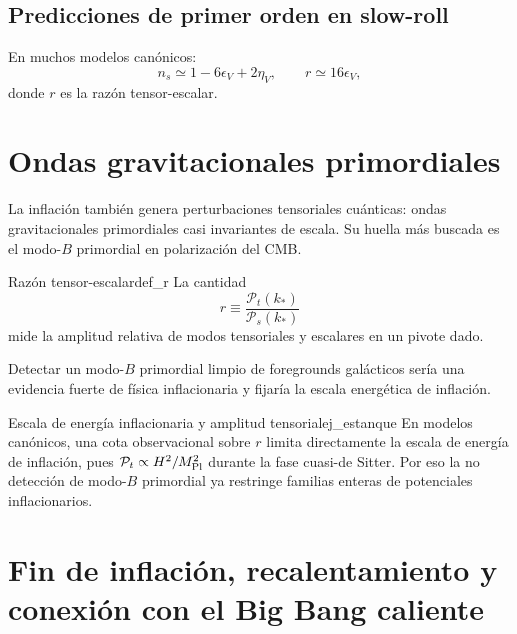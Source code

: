 \subsection{Predicciones de primer orden en slow-roll}

En muchos modelos canónicos:
\begin{equation}
  n_s \simeq 1-6\epsilon_V+2\eta_V,
  \qquad
  r \simeq 16\epsilon_V,
\end{equation}
donde $r$ es la razón tensor-escalar.

\section{Ondas gravitacionales primordiales}
\label{sec:gw_primordiales}

La inflación también genera perturbaciones tensoriales cuánticas: ondas gravitacionales primordiales casi invariantes de escala. Su huella más buscada es el modo-$B$ primordial en polarización del CMB.

\begin{definicion}{Razón tensor-escalar}{def_r}
La cantidad
\begin{equation}
  r \equiv \frac{\mathcal{P}_t(k_*)}{\mathcal{P}_s(k_*)}
\end{equation}
mide la amplitud relativa de modos tensoriales y escalares en un pivote dado.
\end{definicion}

\begin{importante}
Detectar un modo-$B$ primordial limpio de foregrounds galácticos sería una evidencia fuerte de física inflacionaria y fijaría la escala energética de inflación.
\end{importante}

\begin{ejemplo}{Escala de energía inflacionaria y amplitud tensorial}{ej_estanque}
En modelos canónicos, una cota observacional sobre $r$ limita directamente la escala de energía de inflación, pues $\mathcal{P}_t\propto H^2/M_{\rm Pl}^2$ durante la fase cuasi-de Sitter. Por eso la no detección de modo-$B$ primordial ya restringe familias enteras de potenciales inflacionarios.
\end{ejemplo}

\section{Fin de inflación, recalentamiento y conexión con el Big Bang caliente}
\label{sec:reheating}

